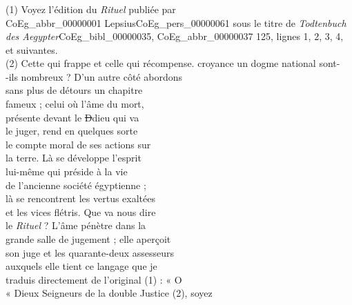 \documentclass{book}
\begin{document}
{\begin{paracol}{2}
\noindent \\
\\
\\
\\
\\
\\
\\
\\
\\
\\
\\
\\
\\
\\
\\
(1) Voyez l’édition du \textit{Rituel} publiée par\\
\gls{CoEg_abbr_00000001} Lepsius\gls{CoEg_pers_00000061} sous le titre de \textit{Todtenbuch\\
des Aegypter}\gls{CoEg_bibl_00000035}, \Gls{CoEg_abbr_00000037} 125, lignes 1, 2, 3, 4,\\
et suivantes.\\
(2) Cette qui frappe et celle qui récompense.
\switchcolumn
\noindent croyance un dogme national sont-\\
-ils nombreux ? D’un autre côté abordons\\
sans plus de détours un chapitre\\
fameux ; celui où l’âme du mort,\\
présente devant le \sout{D}dieu qui va\\
le juger, rend en quelques sorte\\
le compte moral de ses actions sur\\
la terre. Là se développe l’esprit\\
lui-même qui préside à la vie\\
de l’ancienne société égyptienne ;\\
là se rencontrent les vertus exaltées\\
et les vices flétris. Que va nous dire\\
le \textit{Rituel} ? L’âme pénètre dans la\\
grande salle de jugement ; elle aperçoit\\
son juge et les quarante-deux assesseurs\\
auxquels elle tient ce langage que je\\
traduis directement de l’original (1) : « O\\
« Dieux Seigneurs de la double Justice (2), soyez\\

\end{paracol}}
\end{document}
